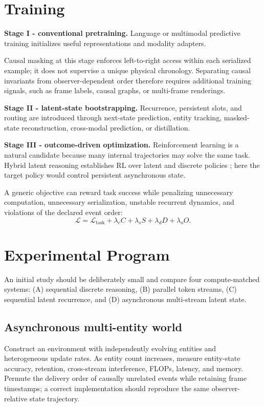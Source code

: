\documentclass[10pt,twocolumn]{article}
\begin{document}
\section{Training}

\textbf{Stage I - conventional pretraining.} Language or multimodal predictive training initializes useful representations and modality adapters.

Causal masking at this stage enforces left-to-right access within each serialized example; it does not supervise a unique physical chronology. Separating causal invariants from observer-dependent order therefore requires additional training signals, such as frame labels, causal graphs, or multi-frame renderings.

\textbf{Stage II - latent-state bootstrapping.} Recurrence, persistent slots, and routing are introduced through next-state prediction, entity tracking, masked-state reconstruction, cross-modal prediction, or distillation.

\textbf{Stage III - outcome-driven optimization.} Reinforcement learning is a natural candidate because many internal trajectories may solve the same task. Hybrid latent reasoning establishes RL over latent and discrete policies \cite{yue2025hybrid}; here the target policy would control persistent asynchronous state.

A generic objective can reward task success while penalizing unnecessary computation, unnecessary serialization, unstable recurrent dynamics, and violations of the declared event order:
\begin{equation}
\mathcal L = \mathcal L_{\mathrm{task}} +
\lambda_c C + \lambda_s S + \lambda_d D + \lambda_o O.
\end{equation}

\section{Experimental Program}

An initial study should be deliberately small and compare four compute-matched systems: (A) sequential discrete reasoning, (B) parallel token streams, (C) sequential latent recurrence, and (D) asynchronous multi-stream latent state.

\subsection{Asynchronous multi-entity world}
Construct an environment with independently evolving entities and heterogeneous update rates. As entity count increases, measure entity-state accuracy, retention, cross-stream interference, FLOPs, latency, and memory. Permute the delivery order of causally unrelated events while retaining frame timestamps; a correct implementation should reproduce the same observer-relative state trajectory.
\end{document}
